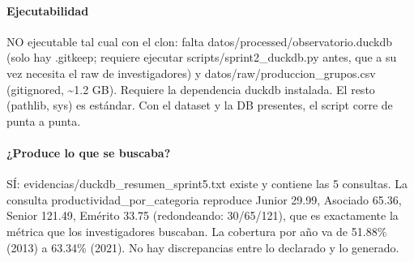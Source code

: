 \paragraph{Ejecutabilidad}
NO ejecutable tal cual con el clon: falta datos/processed/observatorio.duckdb (solo hay .gitkeep; requiere ejecutar scripts/sprint2\_duckdb.py antes, que a su vez necesita el raw de investigadores) y datos/raw/produccion\_grupos.csv (gitignored, \textasciitilde{}1.2 GB). Requiere la dependencia duckdb instalada. El resto (pathlib, sys) es estándar. Con el dataset y la DB presentes, el script corre de punta a punta.

\paragraph{¿Produce lo que se buscaba?}
SÍ: evidencias/duckdb\_resumen\_sprint5.txt existe y contiene las 5 consultas. La consulta productividad\_por\_categoria reproduce Junior 29.99, Asociado 65.36, Senior 121.49, Emérito 33.75 (redondeando: 30/65/121), que es exactamente la métrica que los investigadores buscaban. La cobertura por año va de 51.88\% (2013) a 63.34\% (2021). No hay discrepancias entre lo declarado y lo generado.

